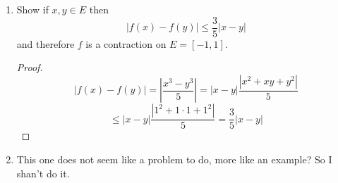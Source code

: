 \documentclass[14pt]{extarticle}
\begin{document}
\begin{enumerate}
\begin{enumerate}
			\item Show if $x,y \in E$ then 
			\[|f(x)-f(y)| \leq \frac{3}{5}|x-y|\]
			and therefore $f$ is a contraction on $E = [-1,1]$.
			\begin{proof}
				\[|f(x)-f(y)| = |\frac{x^3-y^3}{5}| = |x-y|\frac{|x^2+xy+y^2|}{5}\]
				\[ \leq |x-y|\frac{|1^2+1\cdot1+1^2|}{5} = \frac{3}{5}|x-y|\]
			\end{proof}
			
			\item This one does not seem like a problem to do, more like an example? So I shan't do it.
		\end{enumerate}
	\end{enumerate}
\end{document}
